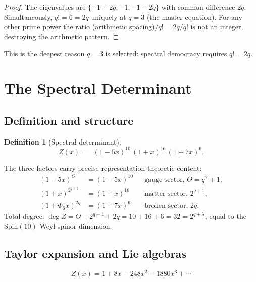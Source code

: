 \documentclass[12pt,a4paper]{article}
\theoremstyle{definition}
\newtheorem{definition}[theorem]{Definition}
\newcommand{\Phisix}{\Phi_6}
\begin{document}
\begin{proof}
The eigenvalues are $\{-1+2q,-1,-1-2q\}$ with common difference $2q$.
Simultaneously, $q!=6=2q$ uniquely at $q=3$ (the master equation).
For any other prime power the ratio (arithmetic spacing)$/q!= 2q/q!$ is
not an integer, destroying the arithmetic pattern.
\end{proof}

\noindent
This is the deepest reason $q=3$ is selected: spectral democracy
requires $q!=2q$.


\section{The Spectral Determinant}
\label{sec:Z}

\subsection{Definition and structure}

\begin{definition}[Spectral determinant]
\begin{equation}
  \label{eq:Z_def}
  Z(x) \;=\; (1-5x)^{10}\,(1+x)^{16}\,(1+7x)^{6}.
\end{equation}
\end{definition}

\noindent
The three factors carry precise representation-theoretic content:
\begin{align}
  (1-5x)^{\Theta}    &= (1-5x)^{10}  && \text{gauge sector, }     \Theta = q^2+1, \\
  (1+x)^{2^{q+1}}   &= (1+x)^{16}   && \text{matter sector, }  2^{q+1}, \\
  (1+\Phisix x)^{2q} &= (1+7x)^{6}  && \text{broken sector, }  2q.
\end{align}
Total degree: $\deg Z = \Theta + 2^{q+1} + 2q = 10+16+6 = 32 = 2^{q+\lambda}$,
equal to the $\mathrm{Spin}(10)$ Weyl-spinor dimension.

\subsection{Taylor expansion and Lie algebras}

\begin{equation}
  \label{eq:Z_taylor}
  Z(x) = 1 + 8x - 248x^2 - 1880x^3 + \cdots
\end{equation}
\end{document}
